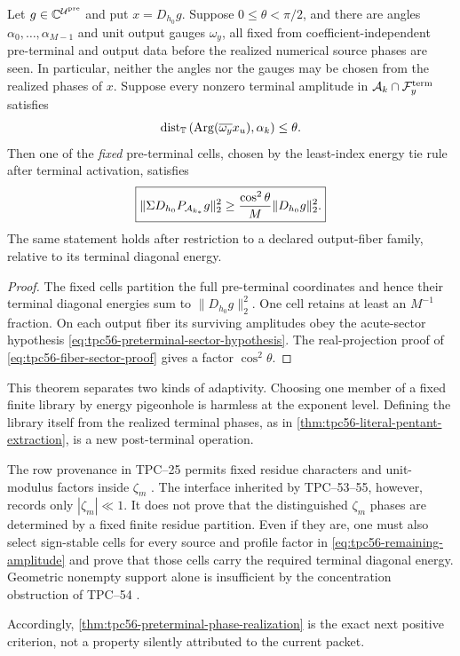 \begin{theorem}
\label{thm:tpc56-preterminal-phase-realization}
Let \(g\in\mathbb C^{\mathcal U^{\rm pre}}\) and put \(x=D_{h_0}g\).  Suppose
\(0\le\theta<\pi/2\), and there are angles
\(\alpha_0,\ldots,\alpha_{M-1}\) and unit output gauges \(\omega_y\), all
fixed from coefficient-independent pre-terminal and output data before the
realized numerical source phases are seen.  In particular, neither the
angles nor the gauges may be chosen from the realized phases of \(x\).
Suppose every nonzero terminal amplitude in
\(\mathcal A_k\cap\mathcal F_y^{\rm term}\) satisfies
\begin{equation}
 \operatorname{dist}_{\mathbb T}
 \left(\operatorname{Arg}(\overline{\omega_y}x_u),\alpha_k\right)
 \le\theta.
 \label{eq:tpc56-preterminal-sector-hypothesis}
\end{equation}
Then one of the \emph{fixed} pre-terminal cells, chosen by the least-index
energy tie rule after terminal activation, satisfies
\begin{equation}
 \boxed{
 \|\Sigma D_{h_0}P_{\mathcal A_{k_*}}g\|_2^2
 \ge\frac{\cos^2\theta}{M}\|D_{h_0}g\|_2^2.}
 \label{eq:tpc56-preterminal-sector-lower}
\end{equation}
The same statement holds after restriction to a declared output-fiber
family, relative to its terminal diagonal energy.
\end{theorem}

\begin{proof}
The fixed cells partition the full pre-terminal coordinates and hence their
terminal diagonal energies sum to \(\|D_{h_0}g\|_2^2\).  One cell retains
at least an \(M^{-1}\) fraction.  On each output fiber its surviving
amplitudes obey the acute-sector hypothesis
\eqref{eq:tpc56-preterminal-sector-hypothesis}.  The real-projection proof
of \eqref{eq:tpc56-fiber-sector-proof} gives a factor
\(\cos^2\theta\).
\end{proof}

This theorem separates two kinds of adaptivity.  Choosing one member of a
fixed finite library by energy pigeonhole is harmless at the exponent
level.  Defining the library itself from the realized terminal phases, as
in \cref{thm:tpc56-literal-pentant-extraction}, is a new post-terminal
operation.

The row provenance in TPC--25 permits fixed residue characters and
unit-modulus factors inside \(\zeta_m\) \citep{WangTPC25}.  The interface
inherited by TPC--53--55, however, records only \(|\zeta_m|\ll1\).  It does
not prove that the distinguished \(\zeta_m\) phases are determined by a
fixed finite residue partition.  Even if they are, one must also select
sign-stable cells for every source and profile factor in
\eqref{eq:tpc56-remaining-amplitude} and prove that those cells carry the
required terminal diagonal energy.  Geometric nonempty support alone is
insufficient by the concentration obstruction of TPC--54
\citep{WangTPC54}.

Accordingly, \cref{thm:tpc56-preterminal-phase-realization} is the exact
next positive criterion, not a property silently attributed to the current
packet.
